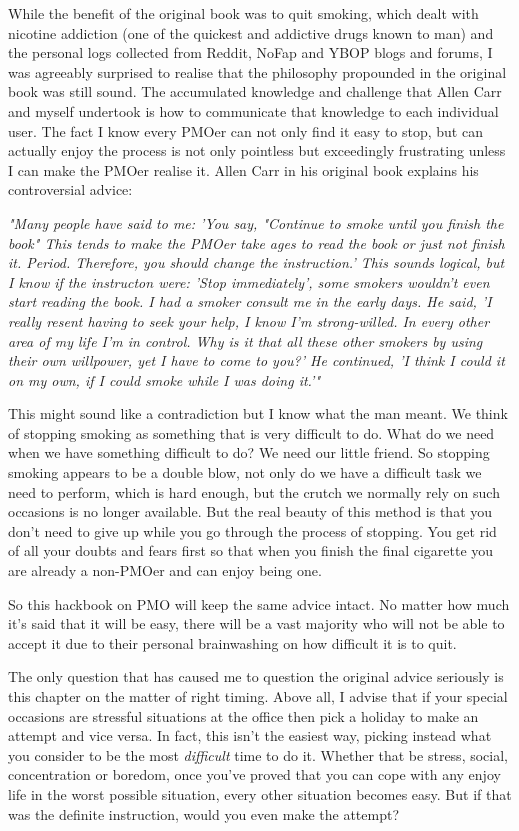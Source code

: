 While the benefit of the original book was to quit smoking, which dealt with nicotine addiction (one of the quickest and addictive drugs known to man) and the personal logs collected from Reddit, NoFap and YBOP blogs and forums, I was agreeably surprised to realise that the philosophy propounded in the original book was still sound. The accumulated knowledge and challenge that Allen Carr and myself undertook is how to communicate that knowledge to each individual user. The fact I know every PMOer can not only find it easy to stop, but can actually enjoy the process is not only pointless but exceedingly frustrating unless I can make the PMOer realise it. Allen Carr in his original book explains his controversial advice:

  \textit{"Many people have said to me: 'You say, "Continue to smoke until you finish the book" This tends to make the PMOer take ages to read the book or just not finish it. Period. Therefore, you should change the instruction.' This sounds logical, but I know if the instructon were: 'Stop immediately', some smokers wouldn't even start reading the book. I had a smoker consult me in the early days. He said, 'I really resent having to seek your help, I know I'm strong-willed. In every other area of my life I'm in control. Why is it that all these other smokers by using their own willpower, yet I have to come to you?' He continued, 'I think I could it on my own, if I could smoke while I was doing it.'"}

This might sound like a contradiction but I know what the man meant. We think of stopping smoking as something that is very difficult to do. What do we need when we have something difficult to do? We need our little friend. So stopping smoking appears to be a double blow, not only do we have a difficult task we need to perform, which is hard enough, but the crutch we normally rely on such occasions is no longer available. But the real beauty of this method is that you don't need to give up while you go through the process of stopping. You get rid of all your doubts and fears first so that when you finish the final cigarette you are already a non-PMOer and can enjoy being one.

So this hackbook on PMO will keep the same advice intact. No matter how much it's said that it will be easy, there will be a vast majority who will not be able to accept it due to their personal brainwashing on how difficult it is to quit.

The only question that has caused me to question the original advice seriously is this chapter on the matter of right timing. Above all, I advise that if your special occasions are stressful situations at the office then pick a holiday to make an attempt and vice versa. In fact, this isn't the easiest way, picking instead what you consider to be the most \textit{difficult} time to do it. Whether that be stress, social, concentration or boredom, once you've proved that you can cope with any enjoy life in the worst possible situation, every other situation becomes easy. But if that was the definite instruction, would you even make the attempt?

